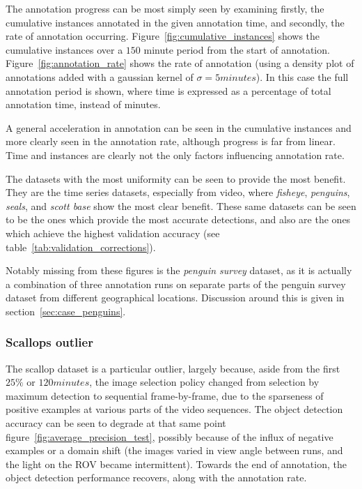 The annotation progress can be most simply seen by examining firstly, the cumulative instances annotated in the given annotation time, and secondly, the rate of annotation occurring. Figure~\ref{fig:cumulative_instances} shows the cumulative instances over a $150$ minute period from the start of annotation. Figure~\ref{fig:annotation_rate} shows the rate of annotation (using a density plot of annotations added with a gaussian kernel of $\sigma = 5 minutes$). In this case the full annotation period is shown, where time is expressed as a percentage of total annotation time, instead of minutes.

A general acceleration in annotation can be seen in the  cumulative instances and more clearly seen in the annotation rate, although progress is far from linear. Time and instances are clearly not the only factors influencing annotation rate. 

The datasets with the most uniformity can be seen to provide the most benefit. They are the time series datasets, especially from video, where \emph{fisheye}, \emph{penguins}, \emph{seals}, and \emph{scott base} show the most clear benefit. These same datasets can be seen to be the ones which provide the most accurate detections, and also are the ones which achieve the highest validation accuracy (see table~\ref{tab:validation_corrections}).

Notably missing from these figures is the \emph{penguin survey} dataset, as it is actually a combination of three annotation runs on separate parts of the penguin survey dataset from different geographical locations. Discussion around this is given in section~\ref{sec:case_penguins}.


\subsubsection{Scallops outlier}
\label{sec:scallop_outlier}

The scallop dataset is a particular outlier, largely because, aside from the first $25\%$ or $120 minutes$, the image selection policy changed from selection by maximum detection to sequential frame-by-frame, due to the sparseness of positive examples at various parts of the video sequences. The object detection accuracy can be seen to degrade at that same point figure~\ref{fig:average_precision_test}, possibly because of the influx of negative examples or a domain shift (the images varied in view angle between runs, and the light on the \gls{ROV} became intermittent). Towards the end of annotation, the object detection performance recovers, along with the annotation rate. 



